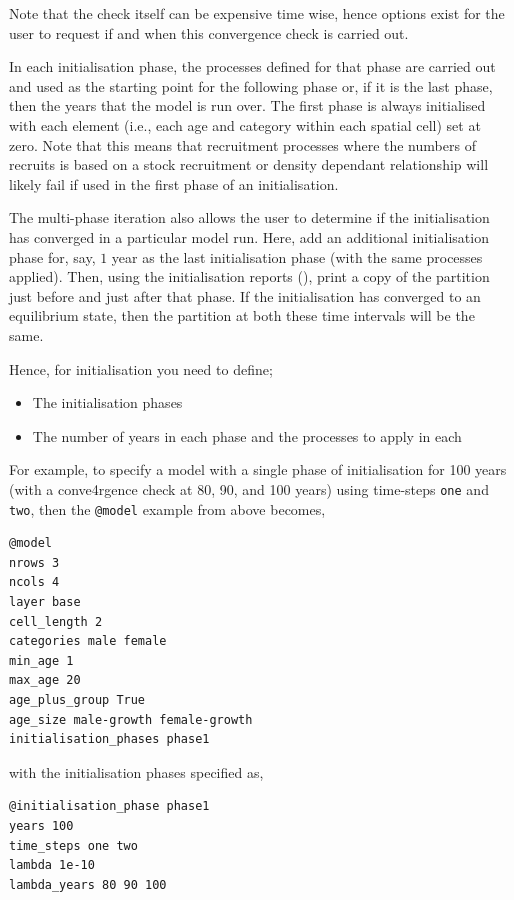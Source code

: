 Note that the check itself can be expensive time wise, hence options exist for the user to request if and when this convergence check is carried out.

In each initialisation phase, the processes defined for that phase are carried out and used as the starting point for the following phase or, if it is the last phase, then the years that the model is run over. The first phase is always initialised with each element (i.e., each age and category within each spatial cell) set at zero. Note that this means that recruitment processes where the numbers of recruits is based on a stock recruitment or density dependant relationship will likely fail if used in the first phase of an initialisation. 

The multi-phase iteration also allows the user to determine if the initialisation has converged in a particular model run. Here, add an additional initialisation phase for, say, $1$ year as the last initialisation phase (with the same processes applied). Then, using the initialisation reports (), print a copy of the partition just before and just after that phase. If the initialisation has converged to an equilibrium state, then the partition at both these time intervals will be the same.

Hence, for initialisation you need to define;
\begin{itemize}
  \item The initialisation phases
  \item The number of years in each phase and the processes to apply in each
\end{itemize}

For example, to specify a model with a single phase of initialisation for 100 years (with a conve4rgence check at 80, 90, and 100 years) using time-steps \texttt{one} and \texttt{two}, then the \texttt{@model} example from above becomes,
{\small{\begin{verbatim}
@model
nrows 3
ncols 4
layer base
cell_length 2
categories male female
min_age 1
max_age 20
age_plus_group True
age_size male-growth female-growth
initialisation_phases phase1
\end{verbatim}}}

with the initialisation phases specified as,
{\small{\begin{verbatim}
@initialisation_phase phase1
years 100
time_steps one two
lambda 1e-10
lambda_years 80 90 100
\end{verbatim}}}

